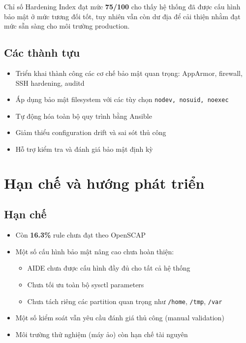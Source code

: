 \noindent Chỉ số Hardening Index đạt mức \textbf{75/100} cho thấy hệ thống đã được cấu hình bảo mật ở mức tương đối tốt, tuy nhiên vẫn còn dư địa để cải thiện nhằm đạt mức sẵn sàng cho môi trường production.

\subsection{Các thành tựu}

\begin{itemize}
\item Triển khai thành công các cơ chế bảo mật quan trọng: AppArmor, firewall, SSH hardening, auditd
\item Áp dụng bảo mật filesystem với các tùy chọn \texttt{nodev, nosuid, noexec}
\item Tự động hóa toàn bộ quy trình bằng Ansible
\item Giảm thiểu configuration drift và sai sót thủ công
\item Hỗ trợ kiểm tra và đánh giá bảo mật định kỳ
\end{itemize}

\section{Hạn chế và hướng phát triển}

\subsection{Hạn chế}

\begin{itemize}
\item Còn \textbf{16.3\%} rule chưa đạt theo OpenSCAP
\item Một số cấu hình bảo mật nâng cao chưa hoàn thiện:
\begin{itemize}
\item AIDE chưa được cấu hình đầy đủ cho tất cả hệ thống
\item Chưa tối ưu toàn bộ sysctl parameters
\item Chưa tách riêng các partition quan trọng như \texttt{/home}, \texttt{/tmp}, \texttt{/var}
\end{itemize}
\item Một số kiểm soát vẫn yêu cầu đánh giá thủ công (manual validation)
\item Môi trường thử nghiệm (máy ảo) còn hạn chế tài nguyên
\end{itemize}

